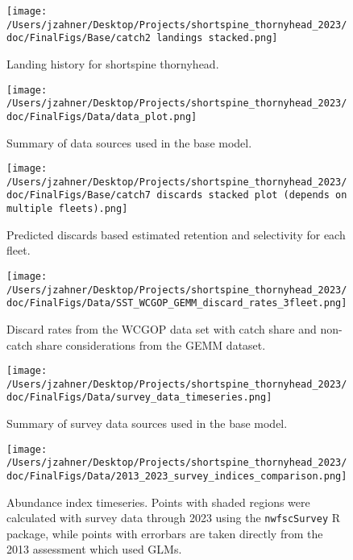 \documentclass[11pt,
  english,
  letterpaper,
]{article}
\begin{document}
\begin{figure}
\centering
\texttt{[image: /Users/jzahner/Desktop/Projects/shortspine\_thornyhead\_2023/doc/FinalFigs/Base/catch2 landings stacked.png]}
\caption{Landing history for shortspine thornyhead.\label{fig:catch_hist}}
\end{figure}

\begin{figure}
\centering
\texttt{[image: /Users/jzahner/Desktop/Projects/shortspine\_thornyhead\_2023/doc/FinalFigs/Data/data\_plot.png]}
\caption{Summary of data sources used in the base model.\label{fig:assessment_data_timeseries}}
\end{figure}

\begin{figure}
\centering
\texttt{[image: /Users/jzahner/Desktop/Projects/shortspine\_thornyhead\_2023/doc/FinalFigs/Base/catch7 discards stacked plot (depends on multiple fleets).png]}
\caption{Predicted discards based estimated retention and selectivity for each fleet.\label{fig:disc_hist}}
\end{figure}

\begin{figure}
\centering
\texttt{[image: /Users/jzahner/Desktop/Projects/shortspine\_thornyhead\_2023/doc/FinalFigs/Data/SST\_WCGOP\_GEMM\_discard\_rates\_3fleet.png]}
\caption{Discard rates from the WCGOP data set with catch share and non-catch share considerations from the GEMM dataset.\label{fig:disc_rates_WCGOP}}
\end{figure}

\begin{figure}
\centering
\texttt{[image: /Users/jzahner/Desktop/Projects/shortspine\_thornyhead\_2023/doc/FinalFigs/Data/survey\_data\_timeseries.png]}
\caption{Summary of survey data sources used in the base model.\label{fig:survey_data_timeseries}}
\end{figure}

\begin{figure}
\centering
\texttt{[image: /Users/jzahner/Desktop/Projects/shortspine\_thornyhead\_2023/doc/FinalFigs/Data/2013\_2023\_survey\_indices\_comparison.png]}
\caption{Abundance index timeseries. Points with shaded regions were calculated with survey data through 2023 using the \texttt{nwfscSurvey} R package, while points with errorbars are taken directly from the 2013 assessment which used GLMs.\label{fig:designbasedsurv}}
\end{figure}
\end{document}
